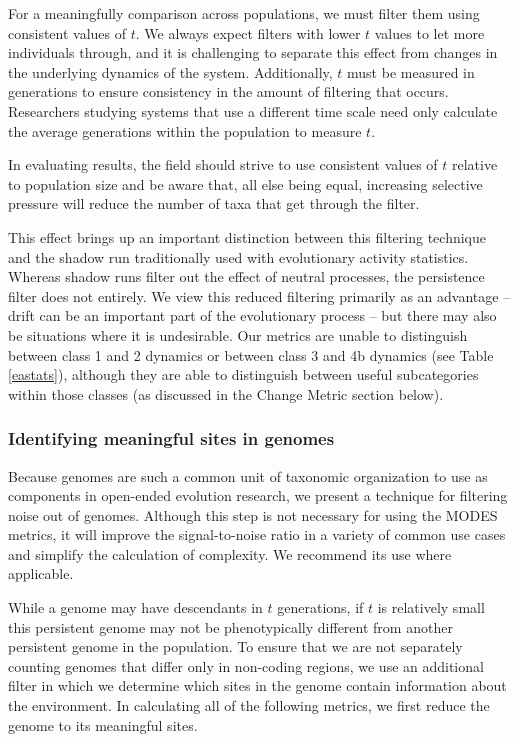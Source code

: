 \documentclass[letterpaper]{article}
\begin{document}
For a meaningfully comparison across populations, we must filter them using consistent values of $t$. We always expect filters with lower $t$ values to let more individuals through, and it is challenging to separate this effect from changes in the underlying dynamics of the system. Additionally, $t$ must be measured in generations to ensure consistency in the amount of filtering that occurs. Researchers studying systems that use a different time scale need only calculate the average generations within the population to measure $t$.

In evaluating results, the field should strive to use consistent values of $t$ relative to population size and be aware that, all else being equal, increasing selective pressure will reduce the number of taxa that get through the filter.

This effect brings up an important distinction between this filtering technique and the shadow run traditionally used with evolutionary activity statistics. Whereas shadow runs filter out the effect of neutral processes, the persistence filter does not entirely. We view this reduced filtering primarily as an advantage -- drift can be an important part of the evolutionary process -- but there may also be situations where it is undesirable. Our metrics are unable to distinguish between class 1 and 2 dynamics or between class 3 and 4b dynamics (see Table \ref{eastats}), although they are able to distinguish between useful subcategories within those classes (as discussed in the Change Metric section below).


\subsubsection{Identifying meaningful sites in genomes}

Because genomes are such a common unit of taxonomic organization to use as components in open-ended evolution research, we present a technique for filtering noise out of genomes. Although this step is not necessary for using the MODES metrics, it will improve the signal-to-noise ratio in a variety of common use cases and simplify the calculation of complexity. We recommend its use where applicable. 

While a genome may have descendants in $t$ generations, if $t$ is relatively small this persistent genome may not be phenotypically different from another persistent genome in the population. To ensure that we are not separately counting genomes that differ only in non-coding regions, we use an additional filter in which we determine which sites in the genome contain information about the environment. In calculating all of the following metrics, we first reduce the genome to its meaningful sites.
    
\end{document}
